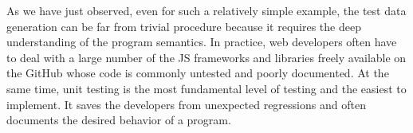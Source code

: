 As we have just observed, even for such a relatively simple example, the test data generation can be far from trivial procedure because it requires the deep understanding of the program semantics. In practice, web developers often have to deal with a large number of the JS frameworks and libraries freely available on the GitHub whose code is commonly untested and poorly documented. At the same time, unit testing is the most fundamental level of testing and the easiest to implement. It saves the developers from unexpected regressions and often documents the desired behavior of a program.
